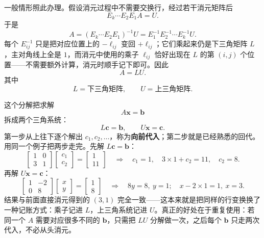 \documentclass[UTF8,a4paper,12pt]{ctexart}
\numberwithin{equation}{section}
\begin{document}
	一般情形照此办理。假设消元过程中不需要交换行，经过若干消元矩阵后
	\begin{equation}\label{eq:4.59}
	E_k\cdots E_2E_1A=U.
	\end{equation}
	于是
	\begin{equation}\label{eq:4.60}
	A=(E_k\cdots E_2E_1)^{-1}U=E_1^{-1}E_2^{-1}\cdots E_k^{-1}U.
	\end{equation}
	每个 $E_{ij}^{-1}$ 只是把对应位置上的 $-\ell_{ij}$ 变回 $+\ell_{ij}$；它们乘起来仍是下三角矩阵 $L$，主对角线上全是 $1$，而消元中使用的乘子 $\ell_{ij}$ 恰好出现在 $L$ 的第 $(i,j)$ 个位置——不需要额外计算，消元时顺手记下即可。因此
	\begin{equation}\label{eq:4.61}
	\boxed{A=LU.}
	\end{equation}
	其中
	\begin{equation}\label{eq:4.62}
	L=\text{下三角矩阵},
	\qquad
	U=\text{上三角矩阵}.
	\end{equation}
	
	这个分解把求解
	\begin{equation}\label{eq:4.63}
	A\bm{x}=\bm{b}
	\end{equation}
	拆成两个三角系统：
	\begin{equation}\label{eq:4.64}
	L\bm{c}=\bm{b},
	\qquad
	U\bm{x}=\bm{c}.
	\end{equation}
	第一步从上往下逐个解出 $c_1,c_2,\ldots$，称为\textbf{向前代入}；第二步就是已经熟悉的回代。用同一个例子把两步走完。先解 $L\bm{c}=\bm{b}$：
	\begin{equation}\label{eq:4.65}
	\begin{bmatrix}
		1&0\\
		3&1
	\end{bmatrix}
	\begin{bmatrix}
		c_1\\c_2
	\end{bmatrix}
	=
	\begin{bmatrix}
		1\\11
	\end{bmatrix}
	\quad\Longrightarrow\quad
	c_1=1,\quad 3\times 1+c_2=11,\quad c_2=8.
	\end{equation}
	再解 $U\bm{x}=\bm{c}$：
	\begin{equation}\label{eq:4.66}
	\begin{bmatrix}
		1&-2\\
		0&8
	\end{bmatrix}
	\begin{bmatrix}
		x\\y
	\end{bmatrix}
	=
	\begin{bmatrix}
		1\\8
	\end{bmatrix}
	\quad\Longrightarrow\quad
	8y=8,\ y=1;\quad x-2\times 1=1,\ x=3.
	\end{equation}
	结果与前面直接消元得到的 $(3,1)$ 完全一致——这本来就是把同样的行变换换了一种记账方式：乘子记进 $L$，上三角系统记进 $U$。真正的好处在于重复使用：若同一个 $A$ 需要对应很多不同的 $\bm{b}$，只需把 $LU$ 分解做一次，之后每个 $\bm{b}$ 只走两次代入，不必从头消元。
	
\end{document}
